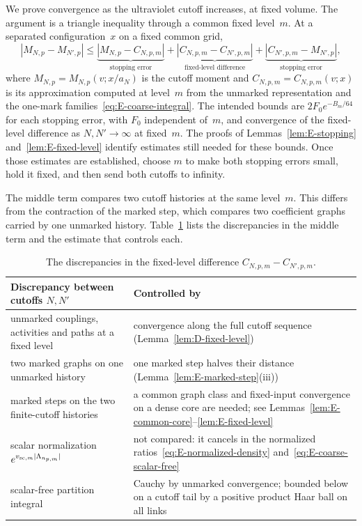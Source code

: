 We prove convergence as the ultraviolet cutoff increases, at fixed volume. The argument is a triangle inequality through a common fixed level~$m$. At a separated configuration~$x$ on a fixed common grid,
\begin{equation}\label{eq:E-three-term}
|M_{N,p}-M_{N',p}|\le
\underbrace{|M_{N,p}-C_{N,p,m}|}_{\text{stopping error}}
+\underbrace{|C_{N,p,m}-C_{N',p,m}|}_{\text{fixed-level difference}}
+\underbrace{|C_{N',p,m}-M_{N',p}|}_{\text{stopping error}},
\end{equation}
where $M_{N,p}=M_{N,p}(v;x/a_N)$ is the cutoff moment and $C_{N,p,m}=C_{N,p,m}(v;x)$ is its approximation computed at level~$m$ from the unmarked representation and the one-mark families~\eqref{eq:E-coarse-integral}. The intended bounds are $2F_0e^{-B_m/64}$ for each stopping error, with $F_0$ independent of~$m$, and convergence of the fixed-level difference as $N,N'\to\infty$ at fixed~$m$. The proofs of Lemmas~\ref{lem:E-stopping} and~\ref{lem:E-fixed-level} identify estimates still needed for these bounds. Once those estimates are established, choose $m$ to make both stopping errors small, hold it fixed, and then send both cutoffs to infinity.

The middle term compares two cutoff histories at the same level~$m$. This differs from the contraction of the marked step, which compares two coefficient graphs carried by one unmarked history. Table~\ref{tab:E-fixed-level} lists the discrepancies in the middle term and the estimate that controls each.

\begin{table}[!h]
\centering\small
\begin{tabular}{@{}p{}p{}@{}}
\toprule
\raggedright Discrepancy between cutoffs $N,N'$ & \raggedright Controlled by\tabularnewline
\midrule
\raggedright unmarked couplings, activities and paths at a fixed level & \raggedright convergence along the full cutoff sequence (Lemma~\ref{lem:D-fixed-level})\tabularnewline
\raggedright two marked graphs on one unmarked history & \raggedright one marked step halves their distance (Lemma~\ref{lem:E-marked-step}(iii))\tabularnewline
\raggedright marked steps on the two finite-cutoff histories & \raggedright a common graph class and fixed-input convergence on a dense core are needed; see Lemmas~\ref{lem:E-common-core}--\ref{lem:E-fixed-level}\tabularnewline
\raggedright scalar normalization $e^{v_{{\rm sc},m}|\Lambda_{n_{p,m}}|}$ & \raggedright not compared: it cancels in the normalized ratios~\eqref{eq:E-normalized-density} and~\eqref{eq:E-coarse-scalar-free}\tabularnewline
\raggedright scalar-free partition integral & \raggedright Cauchy by unmarked convergence; bounded below on a cutoff tail by a positive product Haar ball on all links\tabularnewline
\bottomrule
\end{tabular}
\caption{The discrepancies in the fixed-level difference $C_{N,p,m}-C_{N',p,m}$.}\label{tab:E-fixed-level}
\end{table}

